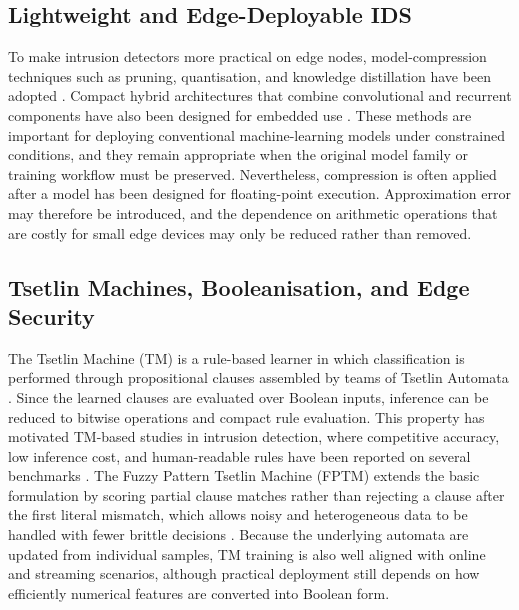 \documentclass[journal,twoside,web]{ieeecolor}
\begin{document}
\subsection{Lightweight and Edge-Deployable IDS}

To make intrusion detectors more practical on edge nodes, model-compression techniques such as pruning, quantisation, and knowledge distillation have been adopted \cite{liu2025compression}. Compact hybrid architectures that combine convolutional and recurrent components have also been designed for embedded use \cite{jouhari2024lightweight}. These methods are important for deploying conventional machine-learning models under constrained conditions, and they remain appropriate when the original model family or training workflow must be preserved. Nevertheless, compression is often applied after a model has been designed for floating-point execution. Approximation error may therefore be introduced, and the dependence on arithmetic operations that are costly for small edge devices may only be reduced rather than removed.

\subsection{Tsetlin Machines, Booleanisation, and Edge Security}

The Tsetlin Machine (TM) is a rule-based learner in which classification is performed through propositional clauses assembled by teams of Tsetlin Automata \cite{granmo2018tsetlin}. Since the learned clauses are evaluated over Boolean inputs, inference can be reduced to bitwise operations and compact rule evaluation. This property has motivated TM-based studies in intrusion detection, where competitive accuracy, low inference cost, and human-readable rules have been reported on several benchmarks \cite{abeyrathna2020intrusion, gunvaldsen2023iot, jaiswal2025iomt}. The Fuzzy Pattern Tsetlin Machine (FPTM) extends the basic formulation by scoring partial clause matches rather than rejecting a clause after the first literal mismatch, which allows noisy and heterogeneous data to be handled with fewer brittle decisions \cite{hnilov2025fptm}. Because the underlying automata are updated from individual samples, TM training is also well aligned with online and streaming scenarios, although practical deployment still depends on how efficiently numerical features are converted into Boolean form.
\end{document}
